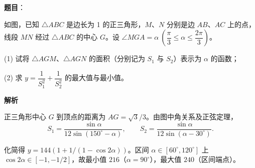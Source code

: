 \begin{answer}

\textbf{题目}：

如图，已知 $\triangle ABC$ 是边长为 1 的正三角形，$M\text{、}N$ 分别是边 $AB\text{、}AC$ 上的点，线段 $MN$ 经过 $\triangle ABC$ 的中心 $G$。设 $\angle MGA=\alpha\ \left(\dfrac\pi3\leqslant\alpha\leqslant\dfrac{2\pi}3\right)$。

(1) 试将 $\triangle AGM\text{、}\triangle AGN$ 的面积（分别记为 $S_1$ 与 $S_2$）表示为 $\alpha$ 的函数；

(2) 求 $y=\dfrac1{S_1^2}+\dfrac1{S_2^2}$ 的最大值与最小值。
\nopagebreak[4]
\begin{center}\end{center}
\nopagebreak[4]
\textbf{解析}


正三角形中心 $G$ 到顶点的距离为 $AG=\sqrt3/3$。由图中角关系及正弦定理，
\nopagebreak[4]
\[
S_1=\frac{\sin\alpha}{12\sin(150^\circ-\alpha)},\qquad
S_2=\frac{\sin\alpha}{12\sin(\alpha-30^\circ)}.
\]


化简得 $y=144(1+1/(1-\cos2\alpha))$。区间 $\alpha\in[60^\circ,120^\circ]$ 上 $\cos2\alpha\in[-1,-1/2]$，故最小值 $216$（$\alpha=90^\circ$），最大值 $240$（区间端点）。



\end{answer}
